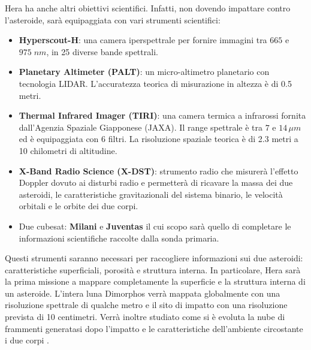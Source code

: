 \documentclass[a4paper,11pt,openright]{book}
\begin{document}
Hera ha anche altri obiettivi scientifici. Infatti, non dovendo impattare contro l'asteroide, sarà equipaggiata con vari strumenti scientifici:
\begin{itemize}
    \item \textbf{Hyperscout-H}: una camera iperspettrale per fornire immagini tra $665$ e $975\; nm$, in 25 diverse bande spettrali.
    \item \textbf{Planetary Altimeter (PALT)}: un micro-altimetro planetario con tecnologia LIDAR. L'accuratezza teorica di misurazione in altezza è di 0.5 metri.
    \item \textbf{Thermal Infrared Imager (TIRI)}: una camera termica a infrarossi fornita dall'Agenzia Spaziale Giapponese (JAXA). Il range spettrale è tra $7$ e $14\,\mu m$ ed è equipaggiata con 6 filtri. La risoluzione spaziale teorica è di 2.3 metri a 10 chilometri di altitudine.
    \item \textbf{X-Band Radio Science (X-DST)}: strumento radio che misurerà l'effetto Doppler dovuto ai disturbi radio e permetterà di ricavare la massa dei due asteroidi, le caratteristiche gravitazionali del sistema binario, le velocità orbitali e le orbite dei due corpi.
    \item Due cubesat: \textbf{Milani} e \textbf{Juventas} il cui scopo sarà quello di completare le informazioni scientifiche raccolte dalla sonda primaria.
\end{itemize}
Questi strumenti saranno necessari per raccogliere informazioni sui due asteroidi: caratteristiche superficiali, porosità e struttura interna. In particolare, Hera sarà la prima missione a mappare completamente la superficie e la struttura interna di un asteroide. L'intera luna Dimorphos verrà mappata globalmente con una risoluzione spettrale di qualche metro e il sito di impatto con una risoluzione prevista di 10 centimetri. Verrà inoltre studiato come si è evoluta la nube di frammenti generatasi dopo l'impatto e le caratteristiche dell'ambiente circostante i due corpi \citep{michel_esa_2022}.
\end{document}
